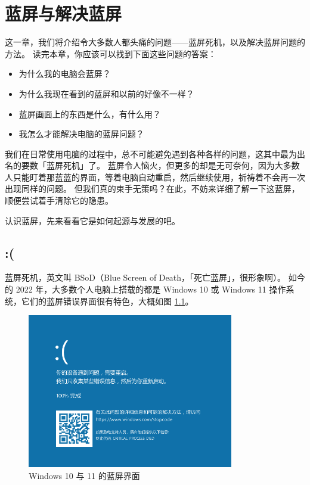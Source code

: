 \chapter{蓝屏与解决蓝屏}
\label{recover-from-bsod}

\begin{intro}
  这一章，我们将介绍令大多数人都头痛的问题——蓝屏死机，以及解决蓝屏问题的方法。
  读完本章，你应该可以找到下面这些问题的答案：
  
  \begin{itemize}
    \item 为什么我的电脑会蓝屏？
    \item 为什么我现在看到的蓝屏和以前的好像不一样？
    \item 蓝屏画面上的东西是什么，有什么用？
    \item 我怎么才能解决电脑的蓝屏问题？
  \end{itemize}
\end{intro}

我们在日常使用电脑的过程中，总不可能避免遇到各种各样的问题，这其中最为出名的要数「蓝屏死机」了。
蓝屏令人恼火，但更多的却是无可奈何，因为大多数人只能盯着那蓝蓝的界面，等着电脑自动重启，然后继续使用，祈祷着不会再一次出现同样的问题。
但我们真的束手无策吗？在此，不妨来详细了解一下这蓝屏，顺便尝试着手清除它的隐患。

认识蓝屏，先来看看它是如何起源与发展的吧。

\section{:(}

蓝屏死机，英文叫 BSoD（Blue Screen of Death，「死亡蓝屏」，很形象啊）。
如今的 2022 年，大多数个人电脑上搭载的都是 Windows 10 或 Windows 11 操作系统，它们的蓝屏错误界面很有特色，大概如图 \ref{Win-10-BSoD}。

\begin{figure}[htb!]
  \centering
  \includegraphics[width=9cm]{assets/Win-10-BSoD.png}
  \caption{Windows 10 与 11 的蓝屏界面}
  \label{Win-10-BSoD}
\end{figure}

